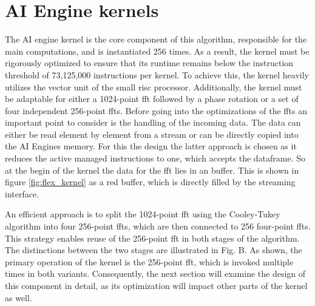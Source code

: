 \section{AI Engine kernels}\label{sec:design_ai}
The AI engine kernel is the core component of this algorithm, responsible for the main computations, and is instantiated 256 times. As a result, the kernel must be rigorously optimized to ensure that its runtime remains below the instruction threshold of 73,125,000 instructions per kernel. To achieve this, the kernel heavily utilizes the vector unit of the small \ac{risc} processor. Additionally, the kernel must be adaptable for either a 1024-point \ac{fft} followed by a phase rotation or a set of four independent 256-point \ac{fft}s. Before going into the optimizations of the \ac{fft}s an important point to consider is the handling of the incoming data. The data can either be read element by element from a stream or can be directly copied into the AI Engines memory. For this the design the latter approach is chosen as it reduces the active managed instructions to one, which accepts the dataframe. So at the begin of the kernel the data for the \ac{fft} lies in an buffer. This is shown in figure \ref{fig:flex_kernel} as a red buffer, which is directly filled by the streaming interface.\par
An efficient approach is to split the 1024-point \ac{fft} using the Cooley-Tukey algorithm into four 256-point \ac{fft}s, which are then connected to 256 four-point \ac{fft}s. This strategy enables reuse of the 256-point \ac{fft} in both stages of the algorithm. The distinctions between the two stages are illustrated in Fig. B. As shown, the primary operation of the kernel is the 256-point \ac{fft}, which is invoked multiple times in both variants. Consequently, the next section will examine the design of this component in detail, as its optimization will impact other parts of the kernel as well.\par


